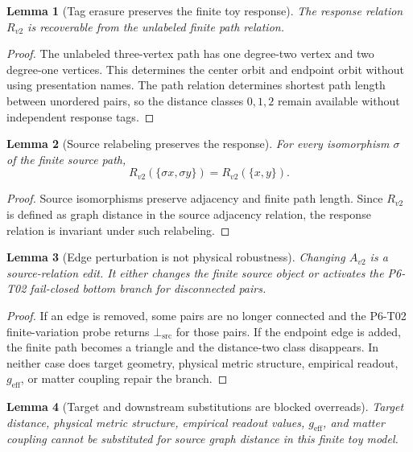 \documentclass[11pt]{article}
\newcommand{\BottomSrc}{\bot_{\mathrm{src}}}
\newtheorem{lemma}{Lemma}
\begin{document}
\begin{lemma}[Tag erasure preserves the finite toy response]
The response relation \(R_{v2}\) is recoverable from the unlabeled finite path
relation.
\end{lemma}

\begin{proof}
The unlabeled three-vertex path has one degree-two vertex and two degree-one
vertices. This determines the center orbit and endpoint orbit without using
presentation names. The path relation determines shortest path length between
unordered pairs, so the distance classes \(0,1,2\) remain available without
independent response tags.
\end{proof}

\begin{lemma}[Source relabeling preserves the response]
For every isomorphism \(\sigma\) of the finite source path,
\[
  R_{v2}(\{\sigma x,\sigma y\})=R_{v2}(\{x,y\}).
\]
\end{lemma}

\begin{proof}
Source isomorphisms preserve adjacency and finite path length. Since
\(R_{v2}\) is defined as graph distance in the source adjacency relation, the
response relation is invariant under such relabeling.
\end{proof}

\begin{lemma}[Edge perturbation is not physical robustness]
Changing \(A_{v2}\) is a source-relation edit. It either changes the finite
source object or activates the P6-T02 fail-closed bottom branch for
disconnected pairs.
\end{lemma}

\begin{proof}
If an edge is removed, some pairs are no longer connected and the P6-T02
finite-variation probe returns \(\BottomSrc\) for those pairs. If the endpoint
edge is added, the finite path becomes a triangle and the distance-two class
disappears. In neither case does target geometry, physical metric structure,
empirical readout, \(g_{\mathrm{eff}}\), or matter coupling repair the branch.
\end{proof}

\begin{lemma}[Target and downstream substitutions are blocked overreads]
Target distance, physical metric structure, empirical readout values,
\(g_{\mathrm{eff}}\), and matter coupling cannot be substituted for
source graph distance in this finite toy model.
\end{lemma}
\end{document}
